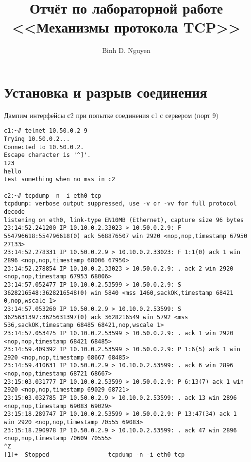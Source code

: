 \documentclass[a4paper,12pt]{article}
\title{Отчёт по лабораторной работе \\ <<Механизмы протокола TCP>>}
\author{Binh D. Nguyen}
\begin{document}
\maketitle

\tableofcontents


\section{Установка и разрыв соединения}

Дампим интерфейсы с2 при попытке соединения с1 с сервером (порт 9)

\begin{lstlisting}
c1:~# telnet 10.50.0.2 9
Trying 10.50.0.2...
Connected to 10.50.0.2.
Escape character is '^]'.
123
hello
test something when no mss in c2

c2:~# tcpdump -n -i eth0 tcp
tcpdump: verbose output suppressed, use -v or -vv for full protocol decode
listening on eth0, link-type EN10MB (Ethernet), capture size 96 bytes
23:14:52.241200 IP 10.10.0.2.33023 > 10.50.0.2.9: F 554796618:554796618(0) ack 568876507 win 2920 <nop,nop,timestamp 67950 27133>
23:14:52.278331 IP 10.50.0.2.9 > 10.10.0.2.33023: F 1:1(0) ack 1 win 2896 <nop,nop,timestamp 68006 67950>
23:14:52.278854 IP 10.10.0.2.33023 > 10.50.0.2.9: . ack 2 win 2920 <nop,nop,timestamp 67953 68006>
23:14:57.052477 IP 10.10.0.2.53599 > 10.50.0.2.9: S 3628216548:3628216548(0) win 5840 <mss 1460,sackOK,timestamp 68421 0,nop,wscale 1>
23:14:57.053260 IP 10.50.0.2.9 > 10.10.0.2.53599: S 3625631397:3625631397(0) ack 3628216549 win 5792 <mss 536,sackOK,timestamp 68485 68421,nop,wscale 1>
23:14:57.053475 IP 10.10.0.2.53599 > 10.50.0.2.9: . ack 1 win 2920 <nop,nop,timestamp 68421 68485>
23:14:59.409392 IP 10.10.0.2.53599 > 10.50.0.2.9: P 1:6(5) ack 1 win 2920 <nop,nop,timestamp 68667 68485>
23:14:59.410631 IP 10.50.0.2.9 > 10.10.0.2.53599: . ack 6 win 2896 <nop,nop,timestamp 68721 68667>
23:15:03.031777 IP 10.10.0.2.53599 > 10.50.0.2.9: P 6:13(7) ack 1 win 2920 <nop,nop,timestamp 69029 68721>
23:15:03.032785 IP 10.50.0.2.9 > 10.10.0.2.53599: . ack 13 win 2896 <nop,nop,timestamp 69083 69029>
23:15:18.289747 IP 10.10.0.2.53599 > 10.50.0.2.9: P 13:47(34) ack 1 win 2920 <nop,nop,timestamp 70555 69083>
23:15:18.290978 IP 10.50.0.2.9 > 10.10.0.2.53599: . ack 47 win 2896 <nop,nop,timestamp 70609 70555>
^Z
[1]+  Stopped                 tcpdump -n -i eth0 tcp
\end{lstlisting}
\end{document}

